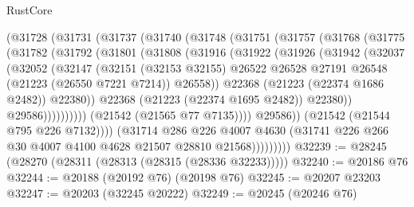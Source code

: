 \begin{lexlean}{RustCore}
\begin{coremodule}
                    (@31728
                      (@31731
                        (@31737
                          (@31740
                            (@31748
                              (@31751
                                (@31757
                                  (@31768
                                    (@31775
                                      (@31782
                                        (@31792
                                          (@31801
                                            (@31808
                                              (@31916
                                                (@31922
                                                  (@31926
                                                    (@31942
                                                      (@32037
                                                        (@32052
                                                          (@32147
                                                            (@32151
                                                              (@32153 @32155)
                                                              @26522
                                                              @26528
                                                              @27191
                                                              @26548
                                                              (@21223 (@26550 @7221 @7214))
                                                              @26558))
                                                          @22368
                                                          (@21223 (@22374 @1686 @2482))
                                                          @22380))
                                                      @22368
                                                      (@21223 (@22374 @1695 @2482))
                                                      @22380))
                                                  @29586))))))))))
                              (@21542 (@21565 @77 @7135))))
                          @29586))
                      (@21542 (@21544 @795 @226 @7132))))
                  (@31714
                    @286
                    @226
                    @4007
                    @4630
                    (@31741 @226 @266 @30 @4007 @4100 @4628 @21507 @28810 @21568)))))))))
@32239 := @28245 (@28270 (@28311 (@28313 (@28315 (@28336 @32233)))))
@32240 := @20186 @76
@32244 := @20188 (@20192 @76) (@20198 @76)
@32245 := @20207 @23203
@32247 := @20203 (@32245 @20222)
@32249 := @20245 (@20246 @76)

\end{coremodule}
\end{lexlean}
